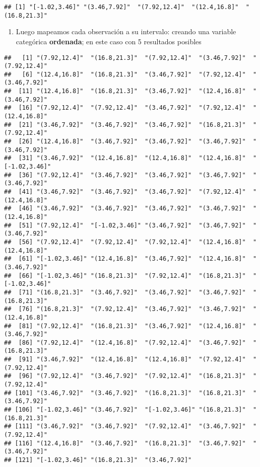 \documentclass[
]{book}
\providecommand{\tightlist}{%
  \setlength{\itemsep}{0pt}\setlength{\parskip}{0pt}}
\begin{document}
\begin{verbatim}
## [1] "[-1.02,3.46]" "(3.46,7.92]"  "(7.92,12.4]"  "(12.4,16.8]"  "(16.8,21.3]"
\end{verbatim}

\begin{enumerate}
\def\labelenumi{\arabic{enumi})}
\setcounter{enumi}{1}
\tightlist
\item
  Luego mapeamos cada observación a su intervalo: creando una variable categórica \textbf{ordenada}; en este caso con 5 resultados posibles
\end{enumerate}

\begin{verbatim}
##   [1] "(7.92,12.4]"  "(16.8,21.3]"  "(7.92,12.4]"  "(3.46,7.92]"  "(7.92,12.4]" 
##   [6] "(12.4,16.8]"  "(16.8,21.3]"  "(3.46,7.92]"  "(7.92,12.4]"  "(3.46,7.92]" 
##  [11] "(12.4,16.8]"  "(16.8,21.3]"  "(3.46,7.92]"  "(12.4,16.8]"  "(3.46,7.92]" 
##  [16] "(7.92,12.4]"  "(7.92,12.4]"  "(3.46,7.92]"  "(7.92,12.4]"  "(12.4,16.8]" 
##  [21] "(3.46,7.92]"  "(3.46,7.92]"  "(3.46,7.92]"  "(16.8,21.3]"  "(7.92,12.4]" 
##  [26] "(12.4,16.8]"  "(3.46,7.92]"  "(3.46,7.92]"  "(3.46,7.92]"  "(3.46,7.92]" 
##  [31] "(3.46,7.92]"  "(12.4,16.8]"  "(12.4,16.8]"  "(12.4,16.8]"  "[-1.02,3.46]"
##  [36] "(7.92,12.4]"  "(3.46,7.92]"  "(3.46,7.92]"  "(3.46,7.92]"  "(3.46,7.92]" 
##  [41] "(3.46,7.92]"  "(3.46,7.92]"  "(3.46,7.92]"  "(7.92,12.4]"  "(12.4,16.8]" 
##  [46] "(3.46,7.92]"  "(3.46,7.92]"  "(3.46,7.92]"  "(3.46,7.92]"  "(12.4,16.8]" 
##  [51] "(7.92,12.4]"  "[-1.02,3.46]" "(3.46,7.92]"  "(3.46,7.92]"  "(3.46,7.92]" 
##  [56] "(7.92,12.4]"  "(7.92,12.4]"  "(7.92,12.4]"  "(12.4,16.8]"  "(12.4,16.8]" 
##  [61] "[-1.02,3.46]" "(12.4,16.8]"  "(3.46,7.92]"  "(12.4,16.8]"  "(3.46,7.92]" 
##  [66] "[-1.02,3.46]" "(16.8,21.3]"  "(7.92,12.4]"  "(16.8,21.3]"  "[-1.02,3.46]"
##  [71] "(16.8,21.3]"  "(3.46,7.92]"  "(3.46,7.92]"  "(3.46,7.92]"  "(16.8,21.3]" 
##  [76] "(16.8,21.3]"  "(7.92,12.4]"  "(3.46,7.92]"  "(3.46,7.92]"  "(12.4,16.8]" 
##  [81] "(7.92,12.4]"  "(16.8,21.3]"  "(3.46,7.92]"  "(12.4,16.8]"  "(3.46,7.92]" 
##  [86] "(7.92,12.4]"  "(12.4,16.8]"  "(7.92,12.4]"  "(3.46,7.92]"  "(16.8,21.3]" 
##  [91] "(3.46,7.92]"  "(12.4,16.8]"  "(12.4,16.8]"  "(7.92,12.4]"  "(7.92,12.4]" 
##  [96] "(7.92,12.4]"  "(3.46,7.92]"  "(7.92,12.4]"  "(16.8,21.3]"  "(7.92,12.4]" 
## [101] "(3.46,7.92]"  "(3.46,7.92]"  "(16.8,21.3]"  "(16.8,21.3]"  "(3.46,7.92]" 
## [106] "[-1.02,3.46]" "(3.46,7.92]"  "[-1.02,3.46]" "(16.8,21.3]"  "(16.8,21.3]" 
## [111] "(3.46,7.92]"  "(3.46,7.92]"  "(7.92,12.4]"  "(3.46,7.92]"  "(7.92,12.4]" 
## [116] "(12.4,16.8]"  "(3.46,7.92]"  "(16.8,21.3]"  "(3.46,7.92]"  "(3.46,7.92]" 
## [121] "[-1.02,3.46]" "(16.8,21.3]"  "(3.46,7.92]"
\end{verbatim}
\end{document}
